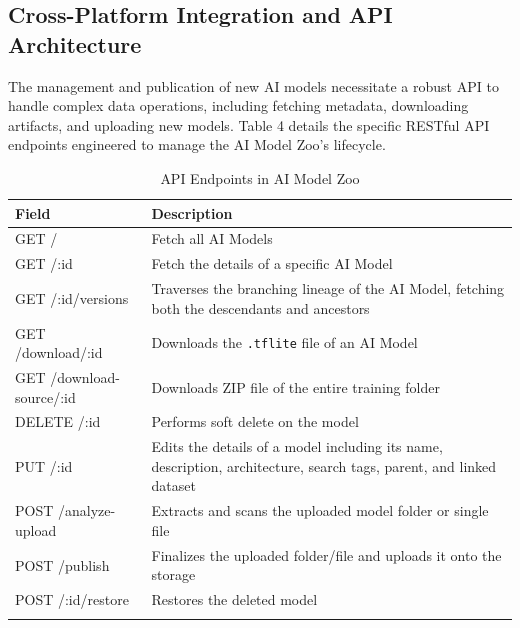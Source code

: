 \documentclass{icsthesis}
\begin{document}
\begin{mainmatter}
            \subsection{Cross-Platform Integration and API Architecture}
            The management and publication of new AI models necessitate a robust API to handle complex data operations, including fetching metadata, downloading artifacts, and uploading new models. Table 4 details the specific RESTful API endpoints engineered to manage the AI Model Zoo's lifecycle.
            
            \begin{table}[htbp]
                \centering
                \caption{API Endpoints in AI Model Zoo}
                \label{tab:api_endpoints}
                \begin{tabular}{p{}p{}}
                    \toprule
                    \textbf{Field}      & \textbf{Description} \\ 
                    \midrule
                    GET /                       & Fetch all AI Models\\ 
                    GET /:id                    & Fetch the details of a specific AI Model\\ 
                    GET /:id/versions           & Traverses the branching lineage of the AI Model, fetching both the descendants and ancestors\\ 
                    GET /download/:id           & Downloads the \texttt{.tflite} file of an AI Model\\ 
                    GET /download-source/:id    & Downloads ZIP file of the entire training folder\\ 
                    DELETE /:id                 & Performs soft delete on the model\\ 
                    PUT /:id                    & Edits the details of a model including its name, description, architecture, search tags, parent, and linked dataset\\
                    POST /analyze-upload        & Extracts and scans the uploaded model folder or single file\\
                    POST /publish               & Finalizes the uploaded folder/file and uploads it onto the storage\\
                    POST /:id/restore           & Restores the deleted model\\
                    \bottomrule
             &\\
                \end{tabular}
            \end{table}
            

\end{mainmatter}
\end{document}
